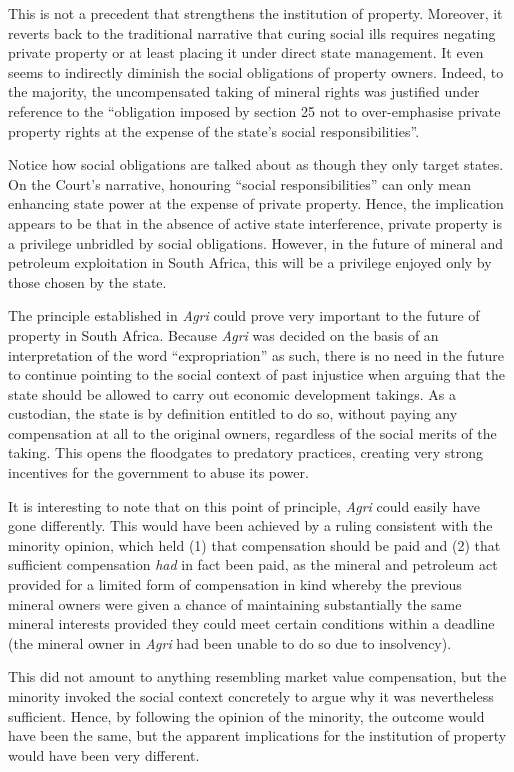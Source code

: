 This is not a precedent that strengthens the institution of property. Moreover, it reverts back to the traditional narrative that curing social ills requires negating private property or at least placing it under direct state management. It even seems to indirectly diminish the social obligations of property owners. Indeed, to the majority, the uncompensated taking of mineral rights was justified under reference to the ``obligation imposed by section 25 not to over-emphasise private property rights at the expense of the state’s social responsibilities''.

Notice how social obligations are talked about as though they only target states. On the Court's narrative, honouring ``social responsibilities'' can only mean enhancing state power at the expense of private property. Hence, the implication appears to be that in the absence of active state interference, private property is a privilege unbridled by social obligations. However, in the future of mineral and petroleum exploitation in South Africa, this will be a privilege enjoyed only by those chosen by the state.

The principle established in {\it Agri} could prove very important to the future of property in South Africa. Because {\it Agri} was decided on the basis of an interpretation of the word ``expropriation'' as such, there is no need in the future to continue pointing to the social context of past injustice when arguing that the state should be allowed to carry out economic development takings. As a custodian, the state is by definition entitled to do so, without paying any compensation at all to the original owners, regardless of the social merits of the taking. This opens the floodgates to predatory practices, creating very strong incentives for the government to abuse its power.

It is interesting to note that on this point of principle, {\it Agri} could easily have gone differently. This would have been achieved by a ruling consistent with the minority opinion, which held (1) that compensation should be paid and (2) that sufficient compensation {\it had} in fact been paid, as the mineral and petroleum act provided for a limited form of compensation in kind whereby the previous mineral owners were given a chance of maintaining substantially the same mineral interests provided they could meet certain conditions within a deadline (the mineral owner in {\it Agri} had been unable to do so due to insolvency).

This did not amount to anything resembling market value compensation, but the minority invoked the social context concretely to argue why it was nevertheless sufficient. Hence, by following the opinion of the minority, the outcome would have been the same, but the apparent implications for the institution of property would have been very different.

